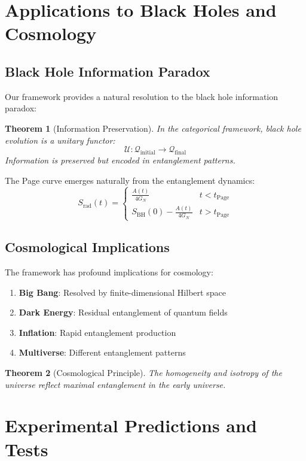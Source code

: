 \documentclass[12pt,a4paper]{article}
\newcommand{\cat}[1]{\mathcal{#1}}
\theoremstyle{plain}
\newtheorem{theorem}{Theorem}[section]
\theoremstyle{definition}
\theoremstyle{remark}
\begin{document}
\section{Applications to Black Holes and Cosmology}

\subsection{Black Hole Information Paradox}

Our framework provides a natural resolution to the black hole information paradox:

\begin{theorem}[Information Preservation]
In the categorical framework, black hole evolution is a unitary functor:
\[\mathcal{U}: \cat{Q}_{\text{initial}} \to \cat{Q}_{\text{final}}\]
Information is preserved but encoded in entanglement patterns.
\end{theorem}

The Page curve emerges naturally from the entanglement dynamics:
\[S_{\text{rad}}(t) = \begin{cases}
\frac{A(t)}{4G_N} & t < t_{\text{Page}} \\
S_{\text{BH}}(0) - \frac{A(t)}{4G_N} & t > t_{\text{Page}}
\end{cases}\]

\subsection{Cosmological Implications}

The framework has profound implications for cosmology:

\begin{enumerate}
\item \textbf{Big Bang}: Resolved by finite-dimensional Hilbert space
\item \textbf{Dark Energy}: Residual entanglement of quantum fields
\item \textbf{Inflation}: Rapid entanglement production
\item \textbf{Multiverse}: Different entanglement patterns
\end{enumerate}

\begin{theorem}[Cosmological Principle]
The homogeneity and isotropy of the universe reflect maximal entanglement in the early universe.
\end{theorem}

\section{Experimental Predictions and Tests}
\end{document}
